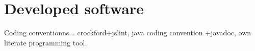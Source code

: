 \chapter{Developed software}
Coding conventionns... crockford+jslint, java coding convention +javadoc, own literate programming tool.

